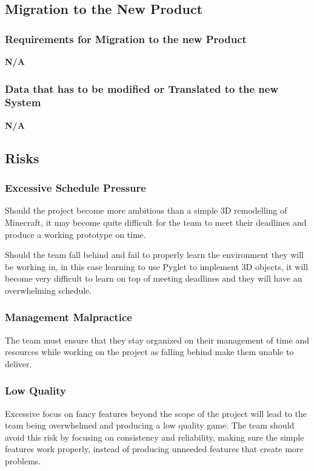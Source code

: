 \documentclass[12pt, titlepage]{article}
\begin{document}
\subsection{Migration to the New Product}
\subsubsection{Requirements for Migration to the new Product}
\textbf{N/A}
\subsubsection{Data that has to be modified or Translated to the new System}
\textbf{N/A}

\subsection{Risks}
\subsubsection{Excessive Schedule Pressure}
Should the project become more ambitious than a simple 3D remodelling of Minecraft, it may become quite difficult for the team to meet their deadlines and produce a working prototype on time.

Should the team fall behind and fail to properly learn the environment they will be working in, in this case learning to use Pyglet to implement 3D objects, it will become very difficult to learn on top of meeting deadlines and they will have an overwhelming schedule.

\subsubsection{Management Malpractice}
The team must ensure that they stay organized on their management of time and resources while working on the project as falling behind make them unable to deliver.

\subsubsection{Low Quality}
Excessive focus on fancy features beyond the scope of the project will lead to the team being overwhelmed and producing a low quality game. The team should avoid this risk by focusing on consistency and reliability, making sure the simple features work properly, instead of producing unneeded features that create more problems.
\end{document}
